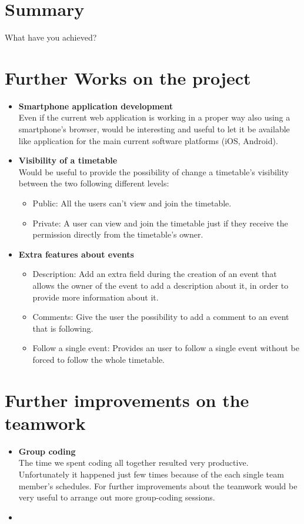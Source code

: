 
\section{Summary}
\vspace{-5mm}
What have you achieved?

\section{Further Works on the project}
\vspace{-5mm}
\begin{itemize}
\item \textbf{Smartphone application development}\\ Even if the current web application is working in a proper way also using a smartphone's browser, would be interesting and useful to let it be available like application for the main current software platforms (iOS, Android).
\item \textbf{Visibility of a timetable}\\
Would be useful to provide the possibility of change a timetable's visibility between the two following different levels:
\vspace{-3mm}
\begin{itemize}
	\item Public: All the users can't view and join the timetable.
	\item Private: A user can view and join the timetable just if they receive the permission directly from the timetable's owner.
\end{itemize}
\item \textbf{Extra features about events}
\vspace{-3mm}
\begin{itemize}
	\item Description: Add an extra field during the creation of an event that allows the owner of the event to add a description about it, in order to provide more information about it.
	\item Comments: Give the user the possibility to add a comment to an event that is following.
	\item Follow a single event: Provides an user to follow a single event without be forced to follow the whole timetable.
\end{itemize}
\end{itemize}

\section{Further improvements on the teamwork}
\vspace{-5mm}
\begin{itemize}
 \item \textbf{Group coding} \\ The time we spent coding all together resulted very productive. Unfortunately it happened just few times because of the each single team member's schedules. For further improvements about the teamwork would be very useful to arrange out more group-coding sessions.
 \item 
\end{itemize}